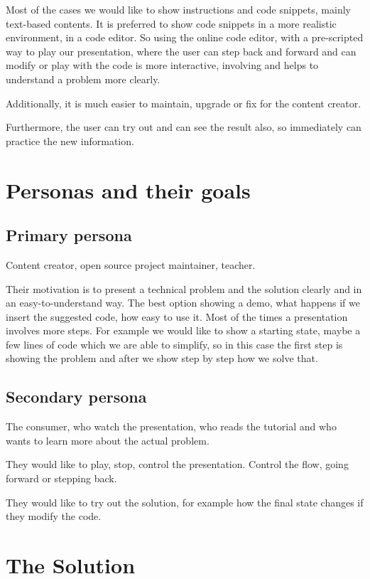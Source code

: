 \documentclass[11pt
              , a4paper
              , twoside
              , openright
              ]{report}
\begin{document}
Most of the cases we would like to show instructions and code snippets, mainly text-based contents. It is preferred to show code snippets in a more realistic environment, in a code editor. So using the online code editor, with a pre-scripted way to play our presentation, where the user can step back and forward and can modify or play with the code is more interactive, involving and helps to understand a problem more clearly.

Additionally, it is much easier to maintain, upgrade or fix for the content creator.

Furthermore, the user can try out and can see the result also, so immediately can practice the new information.

\section{Personas and their goals}

\subsection{Primary persona}

Content creator, open source project maintainer, teacher.

Their motivation is to present a technical problem and the solution clearly and in an easy-to-understand way. The best option showing a demo, what happens if we insert the suggested code, how easy to use it. Most of the times a presentation involves more steps. For example we would like to show a starting state, maybe a few lines of code which we are able to simplify, so in this case the first step is showing the problem and after we show step by step how we solve that.

\subsection{Secondary persona}

The consumer, who watch the presentation, who reads the tutorial and who wants to learn more about the actual problem.

They would like to play, stop, control the presentation. Control the flow, going forward or stepping back.

They would like to try out the solution, for example how the final state changes if they modify the code.

\section{The Solution}
\end{document}
